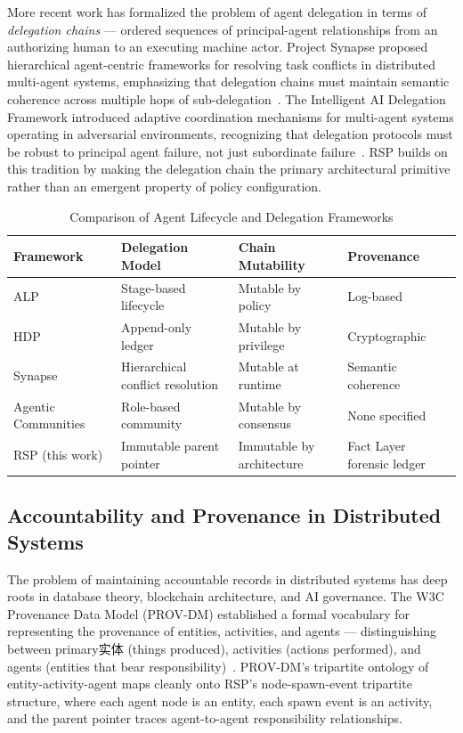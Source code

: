 More recent work has formalized the problem of agent delegation in terms of \textit{delegation chains} — ordered sequences of principal-agent relationships from an authorizing human to an executing machine actor. Project Synapse proposed hierarchical agent-centric frameworks for resolving task conflicts in distributed multi-agent systems, emphasizing that delegation chains must maintain semantic coherence across multiple hops of sub-delegation~\citep{synapse}. The Intelligent AI Delegation Framework introduced adaptive coordination mechanisms for multi-agent systems operating in adversarial environments, recognizing that delegation protocols must be robust to principal agent failure, not just subordinate failure~\citep{intelligent-delegation}. RSP builds on this tradition by making the delegation chain the primary architectural primitive rather than an emergent property of policy configuration.

\begin{table}[ht]
\centering
\caption{Comparison of Agent Lifecycle and Delegation Frameworks}
\label{tab:lifecycle-comparison}
\begin{tabular}{p{3.2cm}p{2.8cm}p{2.8cm}p{3.2cm}}
\toprule
\textbf{Framework} & \textbf{Delegation Model} & \textbf{Chain Mutability} & \textbf{Provenance} \\
\midrule
ALP~\citep{alp2025} & Stage-based lifecycle & Mutable by policy & Log-based \\
HDP~\citep{hdp-draft} & Append-only ledger & Mutable by privilege & Cryptographic \\
Synapse~\citep{synapse} & Hierarchical conflict resolution & Mutable at runtime & Semantic coherence \\
Agentic Communities~\citep{agentic-communities} & Role-based community & Mutable by consensus & None specified \\
RSP (this work) & Immutable parent pointer & Immutable by architecture & Fact Layer forensic ledger \\
\bottomrule
\end{tabular}
\end{table}

\subsection{Accountability and Provenance in Distributed Systems}

The problem of maintaining accountable records in distributed systems has deep roots in database theory, blockchain architecture, and AI governance. The W3C Provenance Data Model (PROV-DM) established a formal vocabulary for representing the provenance of entities, activities, and agents — distinguishing between primary实体 (things produced), activities (actions performed), and agents (entities that bear responsibility)~\citep{provenance-standard,moreau2015-prov}. PROV-DM's tripartite ontology of entity-activity-agent maps cleanly onto RSP's node-spawn-event tripartite structure, where each agent node is an entity, each spawn event is an activity, and the parent pointer traces agent-to-agent responsibility relationships.

